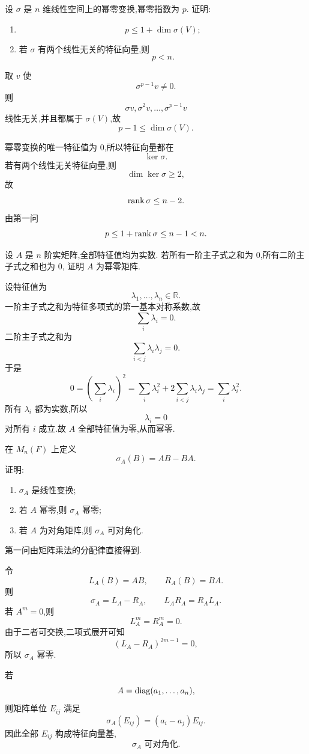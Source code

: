 \begin{example}
设 $\sigma$ 是 $n$ 维线性空间上的幂零变换,幂零指数为 $p$.
证明:
\begin{enumerate}
    \item
    \[
    p\leq1+\dim\sigma(V);
    \]
    \item 若 $\sigma$ 有两个线性无关的特征向量,则
    \[
    p<n.
    \]
\end{enumerate}
\end{example}
\exampleblank

\begin{solution}
取 $v$ 使
\[
\sigma^{p-1}v\neq0.
\]
则
\[
\sigma v,\sigma^2v,\ldots,\sigma^{p-1}v
\]
线性无关,并且都属于 $\sigma(V)$,故
\[
p-1\leq\dim\sigma(V).
\]

幂零变换的唯一特征值为 $0$,所以特征向量都在
\[
\ker\sigma.
\]
若有两个线性无关特征向量,则
\[
\dim\ker\sigma\geq2,
\]
故
\[
\operatorname{rank}\sigma\leq n-2.
\]
由第一问
\[
p\leq1+\operatorname{rank}\sigma\leq n-1<n.
\]
\end{solution}


\begin{example}
设 $A$ 是 $n$ 阶实矩阵,全部特征值均为实数.
若所有一阶主子式之和为 $0$,所有二阶主子式之和也为 $0$,
证明 $A$ 为幂零矩阵.
\end{example}
\exampleblank

\begin{solution}
设特征值为
\[
\lambda_1,\ldots,\lambda_n\in\mathbb{R}.
\]
一阶主子式之和为特征多项式的第一基本对称系数,故
\[
\displaystyle\sum_i\lambda_i=0.
\]
二阶主子式之和为
\[
\displaystyle\sum_{i<j}\lambda_i\lambda_j=0.
\]
于是
\[
0=
\left(\sum_i\lambda_i\right)^2
=
\sum_i\lambda_i^2
+
2\sum_{i<j}\lambda_i\lambda_j
=
\sum_i\lambda_i^2.
\]
所有 $\lambda_i$ 都为实数,所以
\[
\lambda_i=0
\]
对所有 $i$ 成立.故 $A$ 全部特征值为零,从而幂零.
\end{solution}


\begin{example}
在 $M_n(F)$ 上定义
\[
\sigma_A(B)=AB-BA.
\]
证明:
\begin{enumerate}
    \item $\sigma_A$ 是线性变换;
    \item 若 $A$ 幂零,则 $\sigma_A$ 幂零;
    \item 若 $A$ 为对角矩阵,则 $\sigma_A$ 可对角化.
\end{enumerate}
\end{example}
\exampleblank

\begin{solution}
第一问由矩阵乘法的分配律直接得到.

令
\[
L_A(B)=AB,\qquad R_A(B)=BA.
\]
则
\[
\sigma_A=L_A-R_A,
\qquad
L_AR_A=R_AL_A.
\]
若 $A^m=0$,则
\[
L_A^m=R_A^m=0.
\]
由于二者可交换,二项式展开可知
\[
(L_A-R_A)^{2m-1}=0,
\]
所以 $\sigma_A$ 幂零.

若
\[
A=\operatorname{diag}(a_1,\ldots,a_n),
\]
则矩阵单位 $E_{ij}$ 满足
\[
\sigma_A(E_{ij})
=
(a_i-a_j)E_{ij}.
\]
因此全部 $E_{ij}$ 构成特征向量基,
\[
\boxed{\sigma_A\text{ 可对角化}.}
\]
\end{solution}


